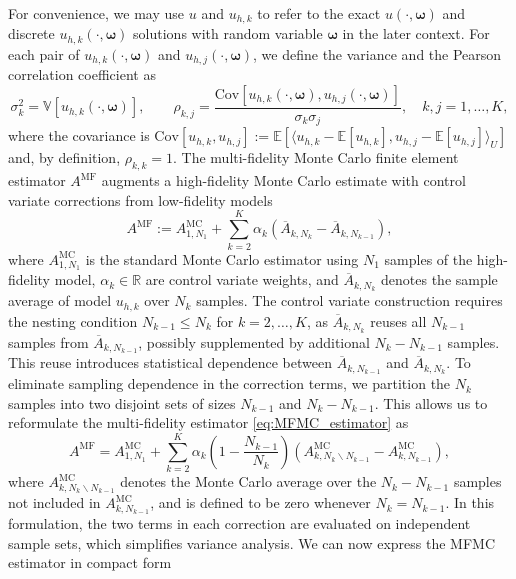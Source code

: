For convenience, we may use $u$ and $u_{h,k}$ to refer to the exact $u(\cdot,\boldsymbol \omega)$ and discrete $u_{h,k}(\cdot,\boldsymbol \omega)$ solutions with random variable $\boldsymbol \omega$ in the later context. For each pair of $u_{h,k}(\cdot,\boldsymbol \omega)$ and $u_{h,j}(\cdot,\boldsymbol \omega)$, we define the variance and the Pearson correlation coefficient as
%
\begin{equation*}
    \sigma_k^2 = \mathbb{V}\left[u_{h,k}(\cdot,\boldsymbol \omega)\right],\qquad \rho_{k,j} = \frac{\text{Cov}\left[ u_{h,k}(\cdot,\boldsymbol \omega), u_{h,j}(\cdot,\boldsymbol \omega)\right]}{\sigma_k\sigma_j}, \quad k,j=1,\dots, K,
\end{equation*}
%
where the covariance is $\text{Cov}[u_{h,k}, u_{h,j}] := \mathbb{E}[\langle u_{h,k} - \mathbb{E}[u_{h,k}], u_{h,j} - \mathbb{E}[u_{h,j}]\rangle_U]$ and, by definition, $\rho_{k,k}=1$. The multi-fidelity Monte Carlo finite element estimator $A^{\text{MF}}$ augments a high-fidelity Monte Carlo estimate with control variate corrections from low-fidelity models
%
\begin{equation}\label{eq:MFMC_estimator}
    A^{\text{MF}} := A^{\text{MC}}_{1,N_1} + \sum_{k=2}^K \alpha_k\left(\overline{A}_{k,N_k} - \overline{A}_{k,N_{k-1}} \right),
\end{equation}
%
where $A^{\text{MC}}_{1,N_1}$ is the standard Monte Carlo estimator using $N_1$ samples of the high-fidelity model, $\alpha_k\in \mathbb{R}$ are control variate weights, and $\overline{A}_{k,N_k}$ denotes the sample average of model $u_{h,k}$ over $N_k$ samples. The control variate construction requires the nesting condition $N_{k-1}\le N_k$ for $k=2,\ldots, K$, as $\overline{A}_{k,N_{k}}$ reuses all $N_{k-1}$ samples from $\overline{A}_{k,N_{k-1}}$, possibly supplemented by additional $N_{k} - N_{k-1}$ samples. This reuse introduces statistical dependence between $\overline{A}_{k,N_{k-1}}$ and $\overline{A}_{k,N_{k}}$. To eliminate sampling dependence in the correction terms, we partition the $N_k$ samples into two disjoint sets of sizes  $N_{k-1}$ and $N_k - N_{k-1}$. This allows us to reformulate the multi-fidelity estimator \eqref{eq:MFMC_estimator} as
%
\begin{equation}\label{eq:MFMC_estimator_independent}
    A^{\text{MF}} = A^{\text{MC}}_{1,N_1} +  \sum_{k=2}^K \alpha_k\left(1-\frac{N_{k-1}}{N_{k}}\right)\left(A_{k,N_k\backslash N_{k-1}}^{\text{MC}}-A_{k,N_{k-1}}^{\text{MC}}\right),
\end{equation}
%
where $A^{\text{MC}}_{k,N_k \backslash N_{k-1}}$ denotes the Monte Carlo average over the $N_k - N_{k-1}$ samples not included in $A^{\text{MC}}_{k,N_{k-1}}$, and is defined to be zero whenever $N_k=N_{k-1}$. In this formulation, the two terms in each correction are evaluated on independent sample sets, which simplifies variance analysis. We can now express the MFMC estimator in compact form
